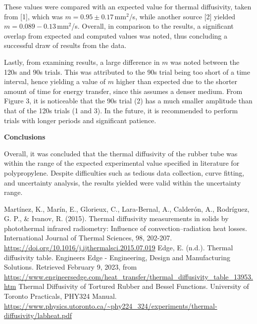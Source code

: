 \documentclass[11pt]{article}
\begin{document}
\begin{multicols}{2}
    These values were compared with an expected value for thermal diffusivity, taken from [1], which was $m = 0.95\pm 0.17 \,$mm$^2$/s, while another source [2] yielded\\  $m = 0.089 - 0.13\,$mm$^2$/s. Overall, in comparison to the results, a significant overlap from expected and computed values was noted, thus concluding a successful draw of results from the data. 
    
    Lastly, from examining results, a large difference in $m$ was noted between the 120s and 90s trials. This was attributed to the 90s trial being too short of a time interval, hence yielding a value of $m$ higher than expected due to the shorter amount of time for energy transfer, since this assumes a denser medium. From Figure 3, it is noticeable that the 90s trial (2) has a much smaller amplitude than that of the 120s trials (1 and 3). In the future, it is recommended to perform trials with longer periods and significant patience.   


    \vspace{10pt}

     \selectfont \textbf{Conclusions}
    
     \selectfont Overall, it was concluded that the thermal diffusivity of the rubber tube was within the range of the expected experimental value specified in literature for polypropylene. Despite difficulties such as tedious data collection, curve fitting, and uncertainty analysis, the results yielded were valid within the uncertainty range.    



\end{multicols}

    \vspace{10pt}
     
     \selectfont

    \begin{thebibliography}{} \selectfont
         Martínez, K., Marín, E., Glorieux, C., Lara-Bernal, A., Calderón, A., Rodríguez, G. P., \& Ivanov, R. (2015). Thermal diffusivity measurements in solids by photothermal infrared radiometry: Influence of convection–radiation heat losses. International Journal of Thermal Sciences, 98, 202-207.
                    \color{blue}\url{https://doi.org/10.1016/j.ijthermalsci.2015.07.019}\color{black}
         Edge, E. (n.d.). Thermal diffusivity table. Engineers Edge - Engineering, Design and Manufacturing Solutions. Retrieved February 9, 2023, from 
                    \color{blue}\url{https://www.engineersedge.com/heat_transfer/thermal_diffusivity_table_13953.htm} \color{black}
         Thermal Diffusivity of Tortured Rubber and Bessel Functions. University of Toronto Practicals, PHY324 Manual. 
                    \color{blue}\url{https://www.physics.utoronto.ca/~phy224_324/experiments/thermal-diffusivity/labheat.pdf}\color{black}
    \end{thebibliography}
\end{document}
